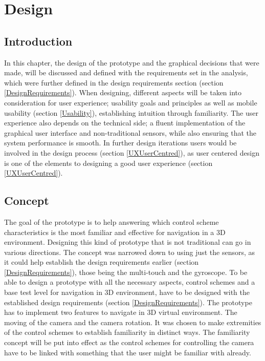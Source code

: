 \chapter{Design}
\section{Introduction}
In this chapter, the design of the prototype and the graphical decisions that were made, will be discussed and defined with the requirements set in the analysis, which were further defined in the design requirements section (section \ref{DesignRequirements}). When designing, different aspects will be taken into consideration for user experience; usability goals and principles as well as mobile usability (section \ref{Usability}), establishing intuition through familiarity. The user experience also depends on the technical side; a fluent implementation of the graphical user interface and non-traditional sensors, while also ensuring that the system performance is smooth. In further design iterations users would be involved in the design process (section \ref{UXUserCentred}), as user centered design is one of the elements to designing a good user experience (section \ref{UXUserCentred}).

\section{Concept}
The goal of the prototype is to help answering which control scheme characteristics is the most familiar and effective for navigation in a 3D environment. Designing this kind of prototype that is not traditional can go in various directions. The concept was narrowed down to using just the sensors, as it could help establish the design requirements earlier (section \ref{DesignRequirements}), those being the multi-touch and the gyroscope.
To be able to design a prototype with all the necessary aspects, control schemes and a base test level for navigation in 3D environment, have to be designed with the established design requirements (section \ref{DesignRequirements}).
The prototype has to implement two features to navigate in 3D virtual environment. The moving of the camera and the camera rotation. It was chosen to make extremities of the control schemes to establish familiarity in distinct ways. The familiarity concept will be put into effect as the control schemes for controlling the camera have to be linked with something that the user might be familiar with already. 

